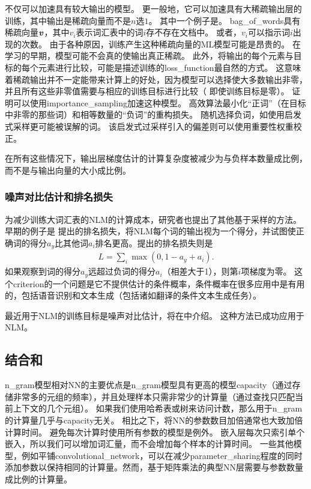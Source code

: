 不仅可以加速具有较大输出的模型。
更一般地，它可以加速具有大稀疏输出层的训练，其中输出是稀疏向量而不是$n$选$1$。
其中一个例子是。
\gls{bag_of_words}具有稀疏向量$\boldsymbol{\mathit{v}}$，其中$v_i$表示词汇表中的词$i$存不存在文档中。
或者，$v_i$可以指示词$i$出现的次数。
由于各种原因，训练产生这种稀疏向量的\gls{ML}模型可能是昂贵的。
在学习的早期，模型可能不会真的使输出真正稀疏。
此外，将输出的每个元素与目标的每个元素进行比较，可能是描述训练的\gls{loss_function}最自然的方式。
这意味着稀疏输出并不一定能带来计算上的好处，因为模型可以选择使大多数输出非零，并且所有这些非零值需要与相应的训练目标进行比较（ 即使训练目标是零）。
\citet{Dauphin2011-small} 证明可以使用\gls{importance_sampling}加速这种模型。
高效算法最小化``正词''（在目标中非零的那些词）和相等数量的``负词''的重构损失。
随机选择负词，如使用启发式采样更可能被误解的词。
该启发式过采样引入的偏差则可以使用重要性权重校正。


在所有这些情况下，输出层梯度估计的计算复杂度被减少为与负样本数量成比例，而不是与输出向量的大小成比例。


\subsubsection{噪声对比估计和排名损失}


\label{sec:combining_neural_language_models_with_n_grams}
为减少训练大词汇表的\gls{NLM}的计算成本，研究者也提出了其他基于采样的方法。
早期的例子是 \citet{Collobert+Weston-ICML2008}提出的排名损失，将\gls{NLM}每个词的输出视为一个得分，并试图使正确词的得分$a_y$比其他词$a_i$排名更高。提出的排名损失则是
\begin{align} 
 L = \sum_i \max(0,1-a_y+a_i).
\end{align} 
如果观察到词的得分$a_y$远超过负词的得分$a_i$（相差大于1），则第$i$项梯度为零。
这个\gls{criterion}的一个问题是它不提供估计的条件概率，条件概率在很多应用中是有用的，包括语音识别和文本生成（包括诸如翻译的条件文本生成任务）。

最近用于\gls{NLM}的训练目标是噪声对比估计，将在中介绍。
这种方法已成功应用于\gls{NLM}\citep{Mnih+Teh-ICML2012,Mnih2013}。


\subsection{结合和}
\gls{n_gram}模型相对\gls{NN}的主要优点是\gls{n_gram}模型具有更高的模型\gls{capacity}（通过存储非常多的元组的频率），并且处理样本只需非常少的计算量（通过查找只匹配当前上下文的几个元组）。
如果我们使用哈希表或树来访问计数，那么用于\gls{n_gram}的计算量几乎与\gls{capacity}无关。
相比之下，将\gls{NN}的参数数目加倍通常也大致加倍计算时间。
避免每次计算时使用所有参数的模型是例外。
嵌入层每次只索引单个嵌入，所以我们可以增加词汇量，而不会增加每个样本的计算时间。
一些其他模型，例如平铺\gls{convolutional_network}，可以在减少\gls{parameter_sharing}程度的同时添加参数以保持相同的计算量。然而，基于矩阵乘法的典型\gls{NN}层需要与参数数量成比例的计算量。

